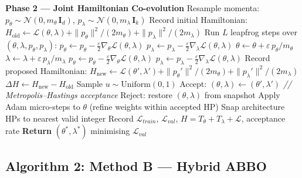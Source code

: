 \documentclass[11pt]{article}
\begin{document}
\begin{algorithm}[H]
\begin{algorithmic}[1]
\State \textbf{Phase 2 — Joint Hamiltonian Co-evolution}
  \State Resample momenta:
         $p_\theta \sim \mathcal{N}(0, m_\theta\,\mathbf{I}_d)$,
         $p_\lambda \sim \mathcal{N}(0, m_\lambda\,\mathbf{I}_k)$
  \State Record initial Hamiltonian:
         $H_{\mathrm{old}} \leftarrow \mathcal{L}(\theta,\lambda)
            + \|p_\theta\|^2/(2m_\theta)
            + \|p_\lambda\|^2/(2m_\lambda)$
  \State Run $L$ leapfrog steps over $(\theta, \lambda, p_\theta, p_\lambda)$:
    \State $p_\theta \leftarrow p_\theta
              - \tfrac{\varepsilon}{2}\nabla_\theta\mathcal{L}(\theta,\lambda)$
           \quad [Eq.\,\eqref{eq:lf1}]
    \State $p_\lambda \leftarrow p_\lambda
              - \tfrac{\varepsilon}{2}\nabla_\lambda\mathcal{L}(\theta,\lambda)$
    \State $\theta \leftarrow \theta + \varepsilon\,p_\theta/m_\theta$
           \quad [Eq.\,\eqref{eq:lf2}]
    \State $\lambda \leftarrow \lambda + \varepsilon\,p_\lambda/m_\lambda$
    \State $p_\theta \leftarrow p_\theta
              - \tfrac{\varepsilon}{2}\nabla_\theta\mathcal{L}(\theta,\lambda)$
           \quad [Eq.\,\eqref{eq:lf3}]
    \State $p_\lambda \leftarrow p_\lambda
              - \tfrac{\varepsilon}{2}\nabla_\lambda\mathcal{L}(\theta,\lambda)$
  \EndFor
  \State Record proposed Hamiltonian:
         $H_{\mathrm{new}} \leftarrow \mathcal{L}(\theta',\lambda')
            + \|p_\theta'\|^2/(2m_\theta)
            + \|p_\lambda'\|^2/(2m_\lambda)$
  \State $\Delta H \leftarrow H_{\mathrm{new}} - H_{\mathrm{old}}$
  \State Sample $u \sim \mathrm{Uniform}(0, 1)$
    \State Accept: $(\theta, \lambda) \leftarrow (\theta', \lambda')$
         \hfill \textit{// Metropolis--Hastings acceptance}
  \Else
    \State Reject: restore $(\theta, \lambda)$ from snapshot
  \EndIf
  \State Apply Adam micro-steps to $\theta$ (refine weights within accepted HP)
  \State Snap architecture HPs to nearest valid integer
  \State Record $\mathcal{L}_{train}$, $\mathcal{L}_{val}$,
         $H = T_\theta + T_\lambda + \mathcal{L}$, acceptance rate
\EndFor
\State \textbf{Return} $(\theta^*, \lambda^*)$ minimising $\mathcal{L}_{val}$
\end{algorithmic}
\end{algorithm}

\subsection{Algorithm 2: Method B — Hybrid ABBO}
\end{document}
